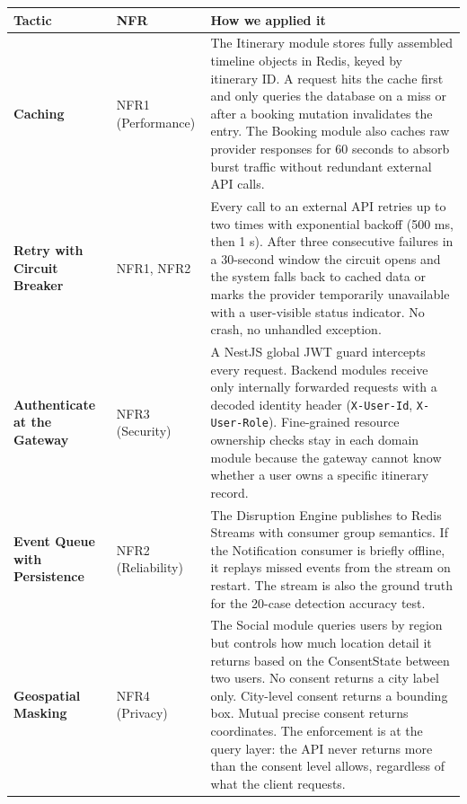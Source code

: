 \documentclass[12pt,a4paper]{article}
\begin{document}
\begin{longtable}{@{}L{3cm}L{2.5cm}L{7cm}@{}}
\toprule
\textbf{Tactic} & \textbf{NFR} & \textbf{How we applied it} \\
\midrule
\endhead

\textbf{Caching} &
  NFR1 (Performance) &
  The Itinerary module stores fully assembled timeline objects in Redis, keyed by itinerary ID.
  A request hits the cache first and only queries the database on a miss or after a booking
  mutation invalidates the entry. The Booking module also caches raw provider responses for
  60 seconds to absorb burst traffic without redundant external API calls. \\[0.5em]

\textbf{Retry with Circuit Breaker} &
  NFR1, NFR2 &
  Every call to an external API retries up to two times with exponential backoff (500 ms, then
  1 s). After three consecutive failures in a 30-second window the circuit opens and the system
  falls back to cached data or marks the provider temporarily unavailable with a user-visible
  status indicator. No crash, no unhandled exception. \\[0.5em]

\textbf{Authenticate at the Gateway} &
  NFR3 (Security) &
  A NestJS global JWT guard intercepts every request. Backend modules receive only internally
  forwarded requests with a decoded identity header (\texttt{X-User-Id}, \texttt{X-User-Role}).
  Fine-grained resource ownership checks stay in each domain module because the gateway cannot
  know whether a user owns a specific itinerary record. \\[0.5em]

\textbf{Event Queue with Persistence} &
  NFR2 (Reliability) &
  The Disruption Engine publishes to Redis Streams with consumer group semantics. If the
  Notification consumer is briefly offline, it replays missed events from the stream on restart.
  The stream is also the ground truth for the 20-case detection accuracy test. \\[0.5em]

\textbf{Geospatial Masking} &
  NFR4 (Privacy) &
  The Social module queries users by region but controls how much location detail it returns
  based on the ConsentState between two users. No consent returns a city label only. City-level
  consent returns a bounding box. Mutual precise consent returns coordinates. The enforcement is
  at the query layer: the API never returns more than the consent level allows, regardless of
  what the client requests. \\

\bottomrule
\end{longtable}
\end{document}
